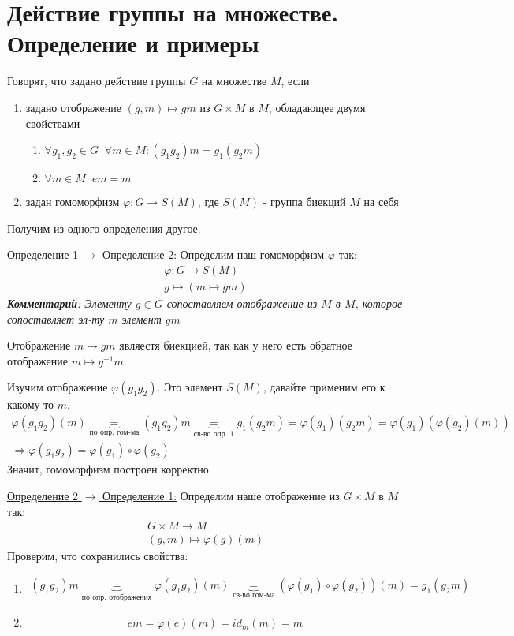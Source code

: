 \section{Действие группы на множестве. Определение и примеры}
\begin{conj}
    Говорят, что задано действие группы $G$ на множестве $M$, если
    \begin{enumerate}
        \item задано отображение $(g, m) \mapsto gm$ из  $G \times M$ в $M$, обладающее двумя свойствами
        \begin{enumerate}
            \item $\forall g_1, g_2 \in G \;\; \forall m \in M : (g_1g_2)m = g_1(g_2m)$ 
            \item $\forall m \in M \;\; em = m$
        \end{enumerate}
        \item задан гомоморфизм $\varphi: G \to S(M)$, где $S(M)$ - группа биекций $M$ на себя
    \end{enumerate}
\end{conj}
Получим из одного определения другое.

\underline{Определение 1 $\to$ Определение 2:} Определим наш гомоморфизм $\varphi$ так:
\begin{gather*}
    \varphi: G \to S(M) \\
    g \mapsto (m \mapsto gm)
\end{gather*} 
\textit{\textbf{Комментарий}: Элементу $g \in G$ сопоставляем отображение из $M$ в $M$, 
которое сопоставляет эл-ту $m$ элемент $gm$}

Отображение $m \mapsto gm$ являестя биекцией, так как у него есть обратное отображение $m \mapsto g^{-1}m$.

Изучим отображение $\varphi(g_1g_2)$. Это элемент $S(M)$, давайте применим его к какому-то $m$.
\begin{gather*}
    \varphi(g_1g_2)(m) \underbrace{=}_{\text{по опр. гом-ма}} (g_1g_2)m \underbrace{=}_{\text{св-во опр. 1}} g_1(g_2m) = \varphi(g_1)(g_2m) = \varphi(g_1)(\varphi(g_2)(m)) \\
    \Rightarrow \varphi(g_1g_2) = \varphi(g_1) \circ \varphi(g_2)
\end{gather*}
Значит, гомоморфизм построен корректно.

\underline{Определение 2 $\to$ Определение 1:} Определим наше отображение из $G \times M$ в $M$ так:
\begin{gather*}
    G \times M \to M \\
    (g, m) \mapsto \varphi(g)(m)
\end{gather*}
Проверим, что сохранились свойства:
\begin{enumerate}
    \item \begin{gather*}
        (g_1g_2)m \underbrace{=}_{\text{по опр. отображения}} \varphi(g_1g_2)(m) \underbrace{=}_{\text{св-во гом-ма}} (\varphi(g_1) \circ \varphi(g_2))(m) = g_1(g_2m)
    \end{gather*}
    \item \[ em = \varphi(e)(m) = id_m(m) = m \]
\end{enumerate}

